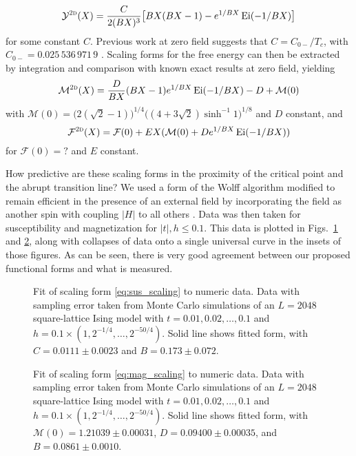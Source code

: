\documentclass[aps,prl,reprint]{revtex4-1}
\def\[{\begin{equation}}
\def\]{\end{equation}}
\def\ei{\mathop{\mathrm{Ei}}\nolimits}
\begin{document}
\[
  \mathcal Y^{\text{\textsc{2d}}}(X)=\frac{C}{2(BX)^3}\big[BX(BX-1)-e^{1/BX}\ei(-1/BX)\big]
  \label{eq:sus_scaling}
\]
for some constant $C$. Previous work at zero field suggests that
$C=C_{0-}/T_c$, with $C_{0-}=0.025\,536\,971\,9$
\cite{barouch.1973.susceptibility}.  Scaling forms for the free energy can
then be extracted by integration and comparison with known exact results at
zero field, yielding
\[
  \mathcal M^{\text{\textsc{2d}}}(X)=\frac{D}{BX}(BX-1)e^{1/BX}\ei(-1/BX)-D+\mathcal M(0)
  \label{eq:mag_scaling}
\]
with $\mathcal M(0)=\big(2(\sqrt2-1)\big)^{1/4}\big((4+3\sqrt2)\sinh^{-1}1\big)^{1/8}$
\cite{onsager.1944.crystal} and $D$ constant, and
\[
  \mathcal F^{\text{\textsc{2d}}}(X)=\mathcal F(0)+EX(\mathcal M(0)+De^{1/BX}\ei(-1/BX))
\]
for $\mathcal F(0)=?$ and $E$ constant.

How predictive are these scaling forms in the proximity of the critical point
and the abrupt transition line? We used a form of the Wolff algorithm modified
to remain efficient in the presence of an external field by incorporating the
field as another spin with coupling $|H|$ to all others
\cite{dimitrovic.1991.finite}. Data was then taken for susceptibility and
magnetization for $|t|,h\leq0.1$. This data is plotted in Figs.~\ref{fig:sus}
and \ref{fig:mag}, along with collapses of data onto a single universal curve
in the insets of those figures. As can be seen, there is very good agreement
between our proposed functional forms and what is measured.

\begin{figure}
  
  \caption{
    Fit of scaling form \eqref{eq:sus_scaling} to numeric data.  Data with
    sampling error taken from Monte Carlo simulations of an $L=2048$
    square-lattice Ising model with $t=0.01,0.02,\ldots,0.1$ and
    $h=0.1\times(1,2^{-1/4},\ldots,2^{-50/4})$. Solid line shows fitted form,
    with $C=0.0111\pm0.0023$ and $B=0.173\pm0.072$.
  }
  \label{fig:sus}
\end{figure}

\begin{figure}
  
  \caption{
    Fit of scaling form \eqref{eq:mag_scaling} to numeric data. Data with
    sampling error taken from Monte Carlo simulations of an $L=2048$
    square-lattice Ising model with $t=0.01,0.02,\ldots,0.1$ and
    $h=0.1\times(1,2^{-1/4},\ldots,2^{-50/4})$. Solid line shows fitted form,
    with $\mathcal M(0)=1.21039\pm0.00031$,
    $D=0.09400\pm0.00035$, and $B=0.0861\pm0.0010$.
  }
  \label{fig:mag}
\end{figure}
\end{document}
